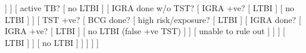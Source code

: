 \documentclass[border=10pt,tikz]{standalone}
\begin{document}
	\begin{forest}
		[ old TB?
			[ untreated old LTBI?
				[ LTBI ]
				[ CXR/sputum +ve?
					[ no LTBI (new active TB) ]
					[ unable to rule out ]
				]
			] 
			[ active TB?
				[ no LTBI ]
				[ IGRA done w/o TST?
					[ IGRA +ve?
						[ LTBI ]
						[ no LTBI ]
					]
					[ TST +ve?
						[ BCG done?
							[ high risk/exposure?
								[ LTBI ]
								[ IGRA done?
									[ IGRA +ve?
										[ LTBI ]
										[ no LTBI (false +ve TST) ]
									]
									[ unable to rule out ]
								]
						 	] 
							[ LTBI ] 
						]
						[ no LTBI ]
					]
				]
			] 
		]
	\end{forest}
\end{document}
